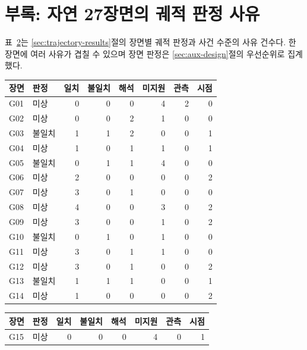 \section*{부록: 자연 27장면의 궤적 판정 사유}
\label{sec:appendix-trajectory}
\begin{revision}
표~\ref{tab:trajectory-details}는 \ref{sec:trajectory-results}절의 장면별 궤적 판정과 사건 수준의 사유 건수다. 한 장면에 여러 사유가 겹칠 수 있으며 장면 판정은 \ref{sec:aux-design}절의 우선순위로 집계했다.

\begin{table}[h]
\centering
\color{revisionblue}
\label{tab:trajectory-details}
\scriptsize
\setlength{\tabcolsep}{3.5pt}
\begin{tabular}[t]{llrrrrrr}
\toprule
장면 & 판정 & 일치 & 불일치 & 해석 & 미지원 & 관측 & 시점 \\
\midrule
G01 & 미상 & 0 & 0 & 0 & 4 & 2 & 0 \\
G02 & 미상 & 0 & 0 & 2 & 1 & 0 & 0 \\
G03 & 불일치 & 1 & 1 & 2 & 0 & 0 & 1 \\
G04 & 미상 & 1 & 0 & 1 & 1 & 0 & 1 \\
G05 & 불일치 & 0 & 1 & 1 & 4 & 0 & 0 \\
G06 & 미상 & 2 & 0 & 0 & 0 & 0 & 2 \\
G07 & 미상 & 3 & 0 & 1 & 0 & 0 & 0 \\
G08 & 미상 & 4 & 0 & 0 & 3 & 0 & 2 \\
G09 & 미상 & 3 & 0 & 0 & 1 & 0 & 2 \\
G10 & 불일치 & 0 & 1 & 0 & 1 & 0 & 0 \\
G11 & 미상 & 3 & 0 & 1 & 1 & 0 & 0 \\
G12 & 미상 & 3 & 0 & 1 & 0 & 0 & 2 \\
G13 & 불일치 & 1 & 1 & 1 & 0 & 0 & 1 \\
G14 & 미상 & 1 & 0 & 0 & 0 & 0 & 2 \\
\bottomrule
\end{tabular}
\hspace{1.5em}
\begin{tabular}[t]{llrrrrrr}
\toprule
장면 & 판정 & 일치 & 불일치 & 해석 & 미지원 & 관측 & 시점 \\
\midrule
G15 & 미상 & 0 & 0 & 0 & 4 & 0 & 1 \\

\end{tabular}
\end{table}
\end{revision}
